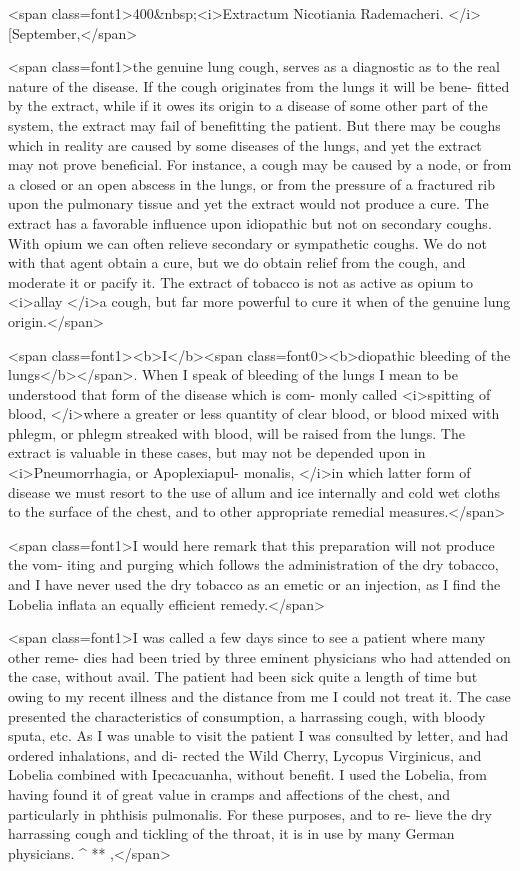 <span class=font1>400&nbsp;<i>Extractum Nicotiania Rademacheri. </i>[September,</span>

<span class=font1>the genuine lung cough, serves as a diagnostic as to the real nature of
the disease. If the cough originates from the lungs it will be bene-
fitted by the extract, while if it owes its origin to a disease of some
other part of the system, the extract may fail of benefitting the
patient. But there may be coughs which in reality are caused by some
diseases of the lungs, and yet the extract may not prove beneficial.
For instance, a cough may be caused by a node, or from a closed or
an open abscess in the lungs, or from the pressure of a fractured rib
upon the pulmonary tissue and yet the extract would not produce a
cure. The extract has a favorable influence upon idiopathic but not
on secondary coughs. With opium we can often relieve secondary or
sympathetic coughs. We do not with that agent obtain a cure, but
we do obtain relief from the cough, and moderate it or pacify it. The
extract of tobacco is not as active as opium to <i>allay </i>a cough, but far
more powerful to cure it when of the genuine lung origin.</span>

<span class=font1><b>I</b><span class=font0><b>diopathic bleeding of the lungs</b></span>. When I speak of bleeding of the
lungs I mean to be understood that form of the disease which is com-
monly called <i>spitting of blood, </i>where a greater or less quantity of clear
blood, or blood mixed with phlegm, or phlegm streaked with blood,
will be raised from the lungs. The extract is valuable in these cases,
but may not be depended upon in <i>Pneumorrhagia, or Apoplexiapul-
monalis, </i>in which latter form of disease we must resort to the use of
allum and ice internally and cold wet cloths to the surface of the
chest, and to other appropriate remedial measures.</span>

<span class=font1>I would here remark that this preparation will not produce the vom-
iting and purging which follows the administration of the dry tobacco,
and I have never used the dry tobacco as an emetic or an injection, as I
find the Lobelia inflata an equally efficient remedy.</span>

<span class=font1>I was called a few days since to see a patient where many other reme-
dies had been tried by three eminent physicians who had attended on
the case, without avail. The patient had been sick quite a length of
time but owing to my recent illness and the distance from me I could
not treat it. The case presented the characteristics of consumption, a
harrassing cough, with bloody sputa, etc. As I was unable to visit the
patient I was consulted by letter, and had ordered inhalations, and di-
rected the Wild Cherry, Lycopus Virginicus, and Lobelia combined
with Ipecacuanha, without benefit. I used the Lobelia, from having
found it of great value in cramps and affections of the chest, and
particularly in phthisis pulmonalis. For these purposes, and to re-
lieve the dry harrassing cough and tickling of the throat, it is in use
by many German physicians.    ^ ** ,</span>\endinput
